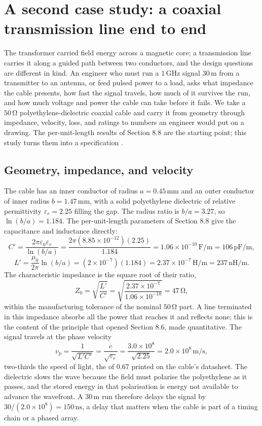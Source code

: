 \section{A second case study: a coaxial transmission line end to end}

The transformer carried field energy across a magnetic core; a
transmission line carries it along a guided path between two conductors,
and the design questions are different in kind. An engineer who must run
a $1\,\si{\giga\hertz}$ signal $30\,\si{\meter}$ from a transmitter to
an antenna, or feed pulsed power to a load, asks what impedance the
cable presents, how fast the signal travels, how much of it survives the
run, and how much voltage and power the cable can take before it fails.
We take a $50\,\si{\ohm}$ polyethylene-dielectric coaxial cable and
carry it from geometry through impedance, velocity, loss, and ratings to
numbers an engineer would put on a drawing. The per-unit-length results
of Section 8.8 are the starting point; this study turns them into a
specification \cite[ch.~2]{text:pozar-microwave}.

\subsection{Geometry, impedance, and velocity}

The cable has an inner conductor of radius $a = 0.45\,\si{\milli\meter}$
and an outer conductor of inner radius $b = 1.47\,\si{\milli\meter}$,
with a solid polyethylene dielectric of relative permittivity
$\varepsilon_r = 2.25$ filling the gap. The radius ratio is $b/a =
3.27$, so $\ln(b/a) = 1.184$. The per-unit-length parameters of
Section 8.8 give the capacitance and inductance directly:
\[
C' = \frac{2\pi\varepsilon_0\varepsilon_r}{\ln(b/a)} =
\frac{2\pi(8.85\times 10^{-12})(2.25)}{1.184} = 1.06\times 10^{-10}\,
\si{\farad\per\meter} = 106\,\si{\pico\farad\per\meter},
\]
\[
L' = \frac{\mu_0}{2\pi}\ln(b/a) = (2\times 10^{-7})(1.184) =
2.37\times 10^{-7}\,\si{\henry\per\meter} = 237\,\si{\nano\henry\per
\meter}.
\]
The characteristic impedance is the square root of their ratio,
\[
Z_0 = \sqrt{\frac{L'}{C'}} = \sqrt{\frac{2.37\times 10^{-7}}{1.06\times
10^{-10}}} = 47\,\si{\ohm},
\]
within the manufacturing tolerance of the nominal $50\,\si{\ohm}$ part.
A line terminated in this impedance absorbs all the power that reaches
it and reflects none; this is the content of the principle that opened
Section 8.6, made quantitative. The signal travels at the phase velocity
\[
v_p = \frac{1}{\sqrt{L'C'}} = \frac{c}{\sqrt{\varepsilon_r}} =
\frac{3.0\times 10^{8}}{\sqrt{2.25}} = 2.0\times 10^{8}\,\si{\meter\per
\second},
\]
two-thirds the speed of light, the  of $0.67$
printed on the cable's datasheet. The dielectric slows the wave because
the field must polarise the polyethylene as it passes, and the stored
energy in that polarisation is energy not available to advance the
wavefront. A $30\,\si{\meter}$ run therefore delays the signal by
$30/(2.0\times 10^8) = 150\,\si{\nano\second}$, a delay that matters
when the cable is part of a timing chain or a phased array.

